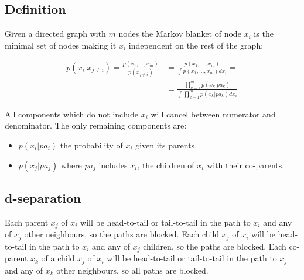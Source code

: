 	\subsection{Definition}
	Given a directed graph with $m$ nodes the Markov blanket of node $x_i$ is the minimal set of nodes making it $x_i$ independent on the rest of the graph:

	\begin{align*}
		p(x_i|x_{j\neq i}) = \frac{p(x_1, \dots, x_m)}{p(x_{j\neq i})} &= \frac{p(x_1, \dots, x_m)}{\int p(x_1, \dots, x_m)dx_i}=\\
																																	&=\frac{\prod\limits_{k=1}^mp(x_k|pa_k)}{\int\prod\limits_{k=1}^mp(x_k|pa_k)dx_i}
	\end{align*}

	All components which do not include $x_i$ will cancel between numerator and denominator.
	The only remaining components are:

	\begin{multicols}{2}
		\begin{itemize}
			\item $p(x_i|pa_i)$ the probability of $x_i$ given its parents.
			\item $p(x_j|pa_j)$ where $pa_j$ includes $x_i$, the children of $x_i$ with their co-parents.
		\end{itemize}
	\end{multicols}

	\subsection{d-separation}
	Each parent $x_j$ of $x_i$ will be head-to-tail or tail-to-tail in the path to $x_i$ and any of $x_j$ other neighbours, so the paths are blocked.
	Each child $x_j$ of $x_i$ will be head-to-tail in the path to $x_i$ and any of $x_j$ children, so the paths are blocked.
	Each co-parent $x_k$ of a child $x_j$ of $x_i$ will be head-to-tail or tail-to-tail in the path to $x_j$ and any of $x_k$ other neighbours, so all paths are blocked.
